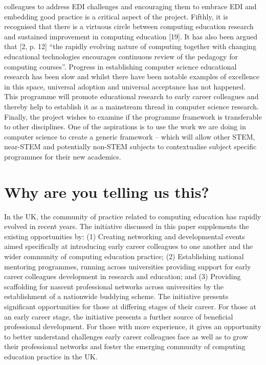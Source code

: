 \documentclass[sigconf]{acmart}
\begin{document}
colleagues to address EDI challenges and encouraging them to embrace
EDI and embedding good practice is a critical aspect of the
project. Fifthly, it is recognised that there is a virtuous circle
between computing education research and sustained improvement in
computing education [19]. It has also been argued that [2, p. 12] “the
rapidly evolving nature of computing together with changing
educational technologies encourages continuous review of the pedagogy
for computing courses”. Progress in establishing computer science
educational research has been slow and whilst there have been notable
examples of excellence in this space, universal adoption and universal
acceptance has not happened. This programme will promote educational
research to early career colleagues and thereby help to establish it
as a mainstream thread in computer science research. Finally, the
project wishes to examine if the programme framework is transferable
to other disciplines. One of the aspirations is to use the work we are
doing in computer science to create a generic framework – which will
allow other STEM, near-STEM and potentially non-STEM subjects to
contextualise subject specific programmes for their new academics.


\section{Why are you telling us this?}
 In the UK, the community of practice related to computing education
has rapidly evolved in recent years. The initiative discussed in this
paper supplements the existing opportunities by: (1) Creating
networking and developmental events aimed specifically at introducing
early career colleagues to one another and the wider community of
computing education practice; (2) Establishing national mentoring
programmes, running across universities providing support for early
career colleagues development in research and education; and (3)
Providing scaffolding for nascent professional networks across
universities by the establishment of a nationwide buddying scheme. The
initiative presents significant opportunities for those at differing
stages of their career.  For those at an early career stage, the
initiative presents a further source of beneficial professional
development. For those with more experience, it gives an opportunity
to better understand challenges early career colleagues face as well
as to grow their professional networks and foster the emerging
community of computing education practice in the UK.

	
	
	




\end{document}
